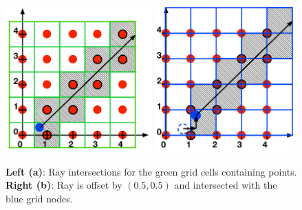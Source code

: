 \documentclass[12pt, letterpaper]{article}
\begin{document}
\begin{figure}[htbp]
\begin{center}
\includegraphics[width=0.50\textwidth]{GridCellsRay.pdf}
\includegraphics[width=0.48\textwidth]{GridNodesRay.pdf}
\caption{{\bf Left (a)}: Ray intersections for the green grid cells containing points. {\bf Right (b)}: Ray is offset by $(0.5,0.5)$ and intersected with the blue grid nodes.}
\label{fig:CellsNodesRay}
\end{center}
\end{figure}
\end{document}
